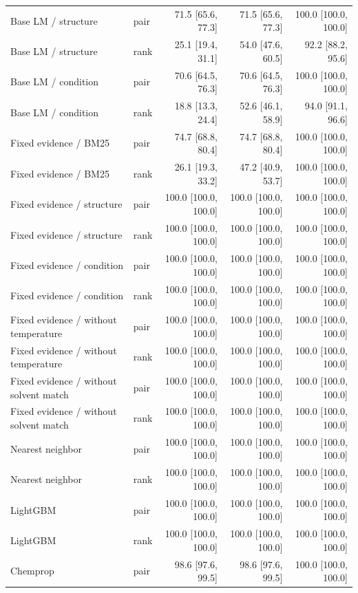 \begin{longtable}{p{.26\linewidth}lrrr}
Base LM / structure & pair & 71.5 [65.6, 77.3] & 71.5 [65.6, 77.3] & 100.0 [100.0, 100.0] \\
Base LM / structure & rank & 25.1 [19.4, 31.1] & 54.0 [47.6, 60.5] & 92.2 [88.2, 95.6] \\
Base LM / condition & pair & 70.6 [64.5, 76.3] & 70.6 [64.5, 76.3] & 100.0 [100.0, 100.0] \\
Base LM / condition & rank & 18.8 [13.3, 24.4] & 52.6 [46.1, 58.9] & 94.0 [91.1, 96.6] \\
Fixed evidence / BM25 & pair & 74.7 [68.8, 80.4] & 74.7 [68.8, 80.4] & 100.0 [100.0, 100.0] \\
Fixed evidence / BM25 & rank & 26.1 [19.3, 33.2] & 47.2 [40.9, 53.7] & 100.0 [100.0, 100.0] \\
Fixed evidence / structure & pair & 100.0 [100.0, 100.0] & 100.0 [100.0, 100.0] & 100.0 [100.0, 100.0] \\
Fixed evidence / structure & rank & 100.0 [100.0, 100.0] & 100.0 [100.0, 100.0] & 100.0 [100.0, 100.0] \\
Fixed evidence / condition & pair & 100.0 [100.0, 100.0] & 100.0 [100.0, 100.0] & 100.0 [100.0, 100.0] \\
Fixed evidence / condition & rank & 100.0 [100.0, 100.0] & 100.0 [100.0, 100.0] & 100.0 [100.0, 100.0] \\
Fixed evidence / without temperature & pair & 100.0 [100.0, 100.0] & 100.0 [100.0, 100.0] & 100.0 [100.0, 100.0] \\
Fixed evidence / without temperature & rank & 100.0 [100.0, 100.0] & 100.0 [100.0, 100.0] & 100.0 [100.0, 100.0] \\
Fixed evidence / without solvent match & pair & 100.0 [100.0, 100.0] & 100.0 [100.0, 100.0] & 100.0 [100.0, 100.0] \\
Fixed evidence / without solvent match & rank & 100.0 [100.0, 100.0] & 100.0 [100.0, 100.0] & 100.0 [100.0, 100.0] \\
Nearest neighbor & pair & 100.0 [100.0, 100.0] & 100.0 [100.0, 100.0] & 100.0 [100.0, 100.0] \\
Nearest neighbor & rank & 100.0 [100.0, 100.0] & 100.0 [100.0, 100.0] & 100.0 [100.0, 100.0] \\
LightGBM & pair & 100.0 [100.0, 100.0] & 100.0 [100.0, 100.0] & 100.0 [100.0, 100.0] \\
LightGBM & rank & 100.0 [100.0, 100.0] & 100.0 [100.0, 100.0] & 100.0 [100.0, 100.0] \\
Chemprop & pair & 98.6 [97.6, 99.5] & 98.6 [97.6, 99.5] & 100.0 [100.0, 100.0] \\

\end{longtable}
